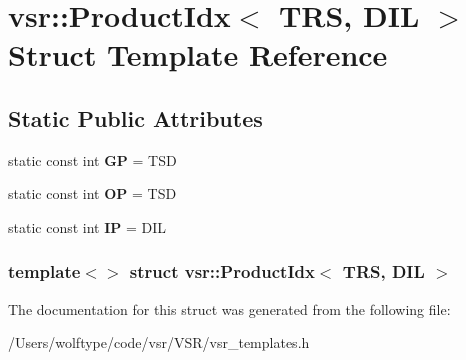 \hypertarget{structvsr_1_1_product_idx_3_01_t_r_s_00_01_d_i_l_01_4}{\section{vsr\-:\-:Product\-Idx$<$ T\-R\-S, D\-I\-L $>$ Struct Template Reference}
\label{structvsr_1_1_product_idx_3_01_t_r_s_00_01_d_i_l_01_4}
}
\subsection*{Static Public Attributes}
\begin{DoxyCompactItemize}
\item 
\hypertarget{structvsr_1_1_product_idx_3_01_t_r_s_00_01_d_i_l_01_4_abc4937c277ed4347728f7476a273626d}{static const int {\bfseries G\-P} = T\-S\-D}\label{structvsr_1_1_product_idx_3_01_t_r_s_00_01_d_i_l_01_4_abc4937c277ed4347728f7476a273626d}

\item 
\hypertarget{structvsr_1_1_product_idx_3_01_t_r_s_00_01_d_i_l_01_4_a07fd58fa3aa45f754fe2c85209f439cd}{static const int {\bfseries O\-P} = T\-S\-D}\label{structvsr_1_1_product_idx_3_01_t_r_s_00_01_d_i_l_01_4_a07fd58fa3aa45f754fe2c85209f439cd}

\item 
\hypertarget{structvsr_1_1_product_idx_3_01_t_r_s_00_01_d_i_l_01_4_a59e158dab92726907d3eb3acf4b9d72e}{static const int {\bfseries I\-P} = D\-I\-L}\label{structvsr_1_1_product_idx_3_01_t_r_s_00_01_d_i_l_01_4_a59e158dab92726907d3eb3acf4b9d72e}

\end{DoxyCompactItemize}
\subsubsection*{template$<$$>$ struct vsr\-::\-Product\-Idx$<$ T\-R\-S, D\-I\-L $>$}



The documentation for this struct was generated from the following file\-:\begin{DoxyCompactItemize}
\item 
/\-Users/wolftype/code/vsr/\-V\-S\-R/vsr\-\_\-templates.\-h\end{DoxyCompactItemize}
